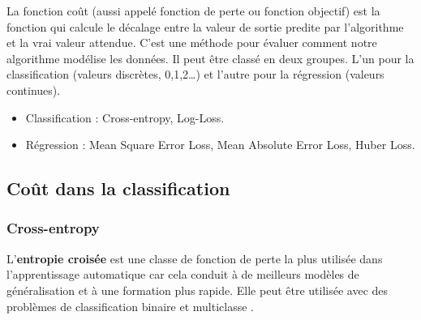 		La fonction coût (aussi appelé fonction de perte ou fonction objectif) est la fonction qui calcule le décalage entre la valeur de sortie predite par l'algorithme et la vrai valeur attendue. C'est une méthode pour évaluer comment notre algorithme modélise les données. Il peut être classé en deux groupes. L'un pour la classification (valeurs discrètes, 0,1,2…) et l'autre pour la régression (valeurs continues).
		\begin{itemize}
			\item Classification :  Cross-entropy, Log-Loss.
			\item Régression :  Mean Square Error Loss, Mean Absolute Error Loss, Huber Loss.
		\end{itemize}
		
			
	\subsection{Coût dans la classification}
		\subsubsection{\textbf{Cross-entropy}}
		
		
		
		L'\textbf{entropie croisée} est une classe de fonction de perte la plus utilisée dans l'apprentissage automatique car cela conduit à de meilleurs modèles de généralisation et à une formation plus rapide\cite{geron2017hands}.
		Elle peut être utilisée avec des problèmes de classification binaire et multiclasse \cite{goodfellow2016deep}. %
		
